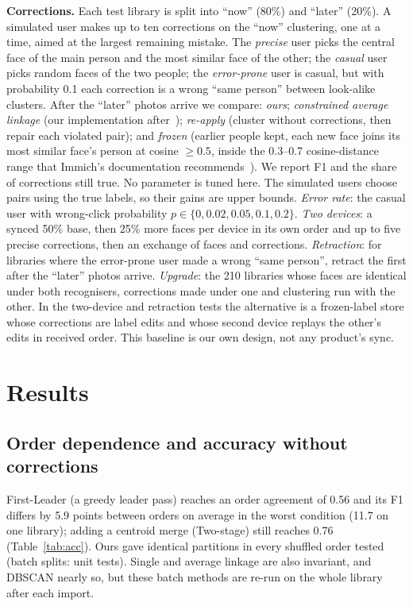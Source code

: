 \documentclass[conference]{IEEEtran}
\begin{document}
\textbf{Corrections.} Each test library is split into ``now'' (80\%) and ``later'' (20\%). A simulated user makes up to ten
corrections on the ``now'' clustering, one at a time, aimed at the largest remaining mistake. The \emph{precise} user picks
the central face of the main person and the most similar face of the other; the \emph{casual} user picks random faces of the
two people; the \emph{error-prone} user is casual, but with probability 0.1 each correction is a wrong ``same person''
between look-alike clusters. After the ``later'' photos arrive we compare: \emph{ours}; \emph{constrained average
linkage} (our implementation after~\cite{davidson2005agglomerative}); \emph{re-apply} (cluster without corrections, then
repair each violated pair); and \emph{frozen} (earlier people kept, each new face joins its most similar face's person at
cosine $\ge0.5$, inside the 0.3--0.7 cosine-distance range that Immich's documentation recommends~\cite{immichdocs}). We report F1 and the share of corrections still true. No parameter is tuned here. The simulated users choose pairs using the true labels, so their gains are upper bounds.
\emph{Error rate}: the casual user with wrong-click probability $p\in\{0,0.02,0.05,0.1,0.2\}$.
\emph{Two devices}: a synced 50\% base, then 25\% more faces per device in its own order and up to five precise corrections,
then an exchange of faces and corrections. \emph{Retraction}: for libraries where the error-prone user made a wrong ``same
person'', retract the first after the ``later'' photos arrive. \emph{Upgrade}: the 210 libraries whose faces are identical
under both recognisers, corrections made under one and clustering run with the other. In the two-device and retraction tests the alternative is
a frozen-label store whose corrections are label edits and whose second device replays the other's edits in received order.
This baseline is our own design, not any product's sync.

\section{Results}
\subsection{Order dependence and accuracy without corrections}\label{sec:acc}
First-Leader (a greedy leader pass) reaches an order agreement of 0.56 and its F1 differs by 5.9 points between orders on average in the worst condition (11.7 on one library); adding a centroid
merge (Two-stage) still reaches 0.76 (Table~\ref{tab:acc}). Ours gave identical partitions in every shuffled order tested (batch splits: unit tests).
Single and average linkage are also invariant, and DBSCAN nearly so, but these batch methods are re-run on the whole library
after each import.
\end{document}
